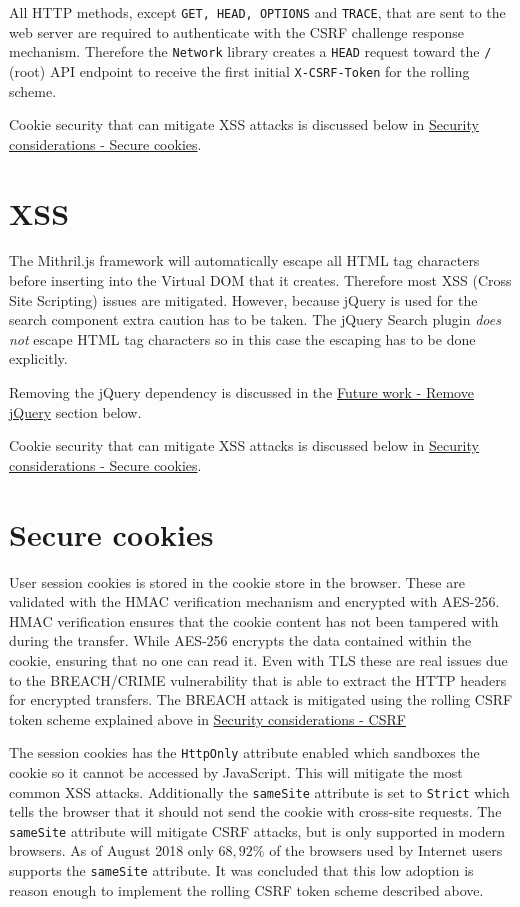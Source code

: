 \documentclass[12pt,a4paper]{report}
\begin{document}
All HTTP methods, except \texttt{GET, HEAD, OPTIONS} and \texttt{TRACE}, that are sent to the web server are required to authenticate with the CSRF challenge response mechanism. Therefore the \texttt{Network} library creates a \texttt{HEAD} request toward the \texttt{/} (root) API endpoint to receive the first initial \texttt{X-CSRF-Token} for the rolling scheme.

Cookie security that can mitigate XSS attacks is discussed below in \hyperref[subsec:secure-cookies]{Security considerations - Secure cookies}.

\section{XSS}
The Mithril.js framework will automatically escape all HTML tag characters before inserting into the Virtual DOM that it creates\cite{mithril-trust}. Therefore most XSS (Cross Site Scripting) issues are mitigated. However, because jQuery is used for the search component extra caution has to be taken. The jQuery Search plugin \textit{does not} escape HTML tag characters so in this case the escaping has to be done explicitly.

Removing the jQuery dependency is discussed in the \hyperref[subsec:remove-jquery]{Future work - Remove jQuery} section below.

Cookie security that can mitigate XSS attacks is discussed below in \hyperref[subsec:secure-cookies]{Security considerations - Secure cookies}.

\section{Secure cookies}
\label{subsec:secure-cookies}
User session cookies is stored in the cookie store in the browser. These are validated with the HMAC verification mechanism and encrypted with AES-256. HMAC verification ensures that the cookie content has not been tampered with during the transfer\cite{fips-198}. While AES-256 encrypts the data contained within the cookie, ensuring that no one can read it\cite{fips-197}. Even with TLS these are real issues due to the BREACH/CRIME vulnerability that is able to extract the HTTP headers for encrypted transfers\cite{breach}. The BREACH attack is mitigated using the rolling CSRF token scheme explained above in \hyperref[subsec:csrf]{Security considerations - CSRF}

The session cookies has the \texttt{HttpOnly} attribute enabled which sandboxes the cookie so it cannot be accessed by JavaScript. This will mitigate the most common XSS attacks\cite{owasp-httponly}. Additionally the \texttt{sameSite} attribute is set to \texttt{Strict} which tells the browser that it should not send the cookie with cross-site requests\cite{owasp-samesite}. The \texttt{sameSite} attribute will mitigate CSRF attacks, but is only supported in modern browsers. As of August 2018 only $68,92 \%$ of the browsers used by Internet users supports the \texttt{sameSite} attribute\cite{owasp-samesite-support}. It was concluded that this low adoption is reason enough to implement the rolling CSRF token scheme described above.
\end{document}
